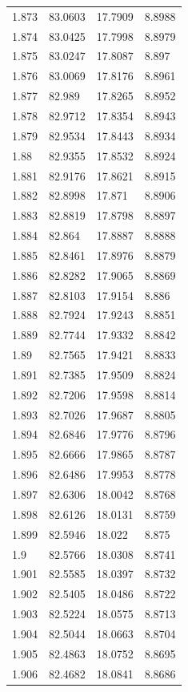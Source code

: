 \begin{tabular}{llll}
1.873 & 83.0603 & 17.7909 & 8.8988 \\
1.874 & 83.0425 & 17.7998 & 8.8979 \\
1.875 & 83.0247 & 17.8087 & 8.897 \\
1.876 & 83.0069 & 17.8176 & 8.8961 \\
1.877 & 82.989 & 17.8265 & 8.8952 \\
1.878 & 82.9712 & 17.8354 & 8.8943 \\
1.879 & 82.9534 & 17.8443 & 8.8934 \\
1.88 & 82.9355 & 17.8532 & 8.8924 \\
1.881 & 82.9176 & 17.8621 & 8.8915 \\
1.882 & 82.8998 & 17.871 & 8.8906 \\
1.883 & 82.8819 & 17.8798 & 8.8897 \\
1.884 & 82.864 & 17.8887 & 8.8888 \\
1.885 & 82.8461 & 17.8976 & 8.8879 \\
1.886 & 82.8282 & 17.9065 & 8.8869 \\
1.887 & 82.8103 & 17.9154 & 8.886 \\
1.888 & 82.7924 & 17.9243 & 8.8851 \\
1.889 & 82.7744 & 17.9332 & 8.8842 \\
1.89 & 82.7565 & 17.9421 & 8.8833 \\
1.891 & 82.7385 & 17.9509 & 8.8824 \\
1.892 & 82.7206 & 17.9598 & 8.8814 \\
1.893 & 82.7026 & 17.9687 & 8.8805 \\
1.894 & 82.6846 & 17.9776 & 8.8796 \\
1.895 & 82.6666 & 17.9865 & 8.8787 \\
1.896 & 82.6486 & 17.9953 & 8.8778 \\
1.897 & 82.6306 & 18.0042 & 8.8768 \\
1.898 & 82.6126 & 18.0131 & 8.8759 \\
1.899 & 82.5946 & 18.022 & 8.875 \\
1.9 & 82.5766 & 18.0308 & 8.8741 \\
1.901 & 82.5585 & 18.0397 & 8.8732 \\
1.902 & 82.5405 & 18.0486 & 8.8722 \\
1.903 & 82.5224 & 18.0575 & 8.8713 \\
1.904 & 82.5044 & 18.0663 & 8.8704 \\
1.905 & 82.4863 & 18.0752 & 8.8695 \\
1.906 & 82.4682 & 18.0841 & 8.8686 \\

\end{tabular}

